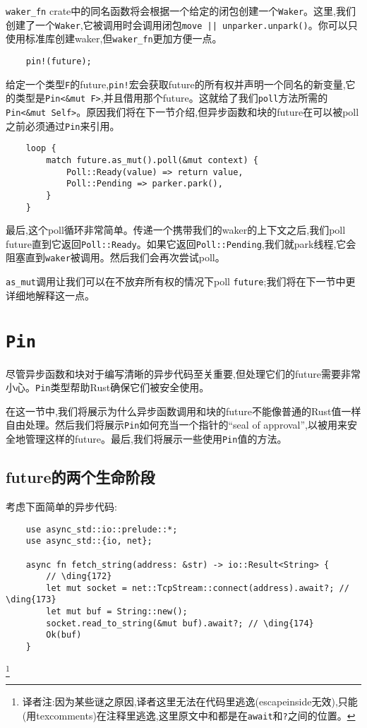 \texttt{waker\_fn} crate中的同名函数将会根据一个给定的闭包创建一个\texttt{Waker}。这里,我们创建了一个\texttt{Waker},它被调用时会调用闭包\texttt{move || unparker.unpark()}。你可以只使用标准库创建waker,但\texttt{waker\_fn}更加方便一点。

\begin{verbatim}
    pin!(future);
\end{verbatim}
给定一个类型\texttt{F}的future,\texttt{pin!}宏会获取future的所有权并声明一个同名的新变量,它的类型是\texttt{Pin<\&mut F>},并且借用那个future。这就给了我们\texttt{poll}方法所需的\texttt{Pin<\&mut Self>}。原因我们将在下一节介绍,但异步函数和块的future在可以被poll之前必须通过\texttt{Pin}来引用。

\begin{verbatim}
    loop {
        match future.as_mut().poll(&mut context) {
            Poll::Ready(value) => return value,
            Poll::Pending => parker.park(),
        }
    }
\end{verbatim}

最后,这个poll循环非常简单。传递一个携带我们的waker的上下文之后,我们poll future直到它返回\texttt{Poll::Ready}。如果它返回\texttt{Poll::Pending},我们就park线程,它会阻塞直到\texttt{waker}被调用。然后我们会再次尝试poll。

\texttt{as\_mut}调用让我们可以在不放弃所有权的情况下poll \texttt{future};我们将在下一节中更详细地解释这一点。

\section{\texttt{Pin}}

尽管异步函数和块对于编写清晰的异步代码至关重要,但处理它们的future需要非常小心。\texttt{Pin}类型帮助Rust确保它们被安全使用。

在这一节中,我们将展示为什么异步函数调用和块的future不能像普通的Rust值一样自由处理。然后我们将展示\texttt{Pin}如何充当一个指针的“seal of approval”,以被用来安全地管理这样的future。最后,我们将展示一些使用\texttt{Pin}值的方法。

\subsection{future的两个生命阶段}
考虑下面简单的异步代码:
\begin{verbatim}
    use async_std::io::prelude::*;
    use async_std::{io, net};

    async fn fetch_string(address: &str) -> io::Result<String> {
        // \ding{172}
        let mut socket = net::TcpStream::connect(address).await?; // \ding{173}
        let mut buf = String::new();
        socket.read_to_string(&mut buf).await?; // \ding{174}
        Ok(buf)
    }
\end{verbatim}
\footnote{译者注:因为某些谜之原因,译者这里无法在代码里逃逸(escapeinside无效),只能(用texcomments)在注释里逃逸,这里原文中和都是在\texttt{await}和\texttt{?}之间的位置。}


